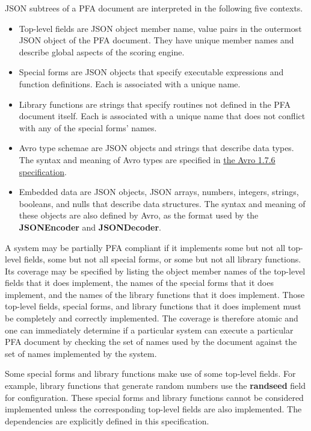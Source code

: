 \documentclass{article}
\newcommand{\PFAc}{\ttfamily\bfseries}
\theoremstyle{definition}
\begin{document}
JSON subtrees of a PFA document are interpreted in the following five contexts.
\begin{itemize}
\item Top-level fields are JSON object member name, value pairs in the outermost JSON object of the PFA document.  They have unique member names and describe global aspects of the scoring engine.
\item Special forms are JSON objects that specify executable expressions and function definitions.  Each is associated with a unique name.
\item Library functions are strings that specify routines not defined in the PFA document itself.  Each is associated with a unique name that does not conflict with any of the special forms' names.
\item Avro type schemae are JSON objects and strings that describe data types.  The syntax and meaning of Avro types are specified in \href{http://avro.apache.org/docs/1.7.6/spec.html}{the Avro 1.7.6 specification}.
\item Embedded data are JSON objects, JSON arrays, numbers, integers, strings, booleans, and nulls that describe data structures.  The syntax and meaning of these objects are also defined by Avro, as the format used by the {\PFAc JSONEncoder} and {\PFAc JSONDecoder}.
\end{itemize}

A system may be partially PFA compliant if it implements some but not all top-level fields, some but not all special forms, or some but not all library functions.  Its coverage may be specified by listing the object member names of the top-level fields that it does implement, the names of the special forms that it does implement, and the names of the library functions that it does implement.  Those top-level fields, special forms, and library functions that it does implement must be completely and correctly implemented.  The coverage is therefore atomic and one can immediately determine if a particular system can execute a particular PFA document by checking the set of names used by the document against the set of names implemented by the system.

Some special forms and library functions make use of some top-level fields.  For example, library functions that generate random numbers use the {\PFAc randseed} field for configuration.  These special forms and library functions cannot be considered implemented unless the corresponding top-level fields are also implemented.  The dependencies are explicitly defined in this specification.
\end{document}
